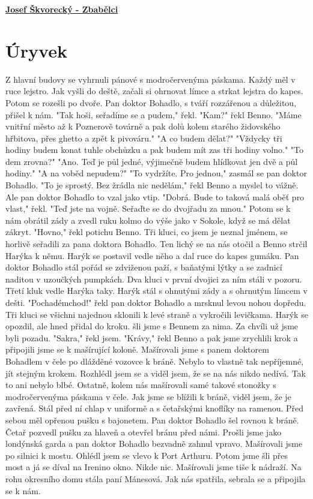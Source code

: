 \documentclass[11pt]{article}
\begin{document}
    \begin{center}
        \underline{\textbf{\Huge Josef Škvorecký - Zbabělci}}
    \end{center}
    \section*{Úryvek}
    Z hlavní budovy se vyhrnuli pánové s modročervenýma
páskama. Každý měl v ruce lejstro. Jak vyšli do deště, začali si
ohrnovat límce a strkat lejstra do kapes. Potom se rozešli po dvoře.
Pan doktor Bohadlo, s tváří rozzářenou a důležitou, přišel k nám.
"Tak hoši, seřadíme se a pudem," řekl.
"Kam?" řekl Benno.
"Máme vnitřní město až k Poznerově továrně a pak dolů
kolem starého židovského hřbitova, přes ghetto a zpět k pivováru."
"A co budem dělat?"
"Vždycky tři hodiny budem konat tuhle obchůzku a pak
budem mít zas tři hodiny volno."
"To dem zrovna?"
"Ano. Teď je půl jedné, výjimečně budem hlídkovat jen dvě a
půl hodiny."
"A na voběd nepudem?"
"To vydržíte. Pro jednou," zasmál se pan doktor Bohadlo.
"To je sprostý. Bez žrádla nic nedělám," řekl Benno a myslel to
vážně. Ale pan doktor Bohadlo to vzal jako vtip.
"Dobrá. Bude to taková malá oběť pro vlast," řekl. "Teď jste na
vojně. Seřaďte se do dvojřadu za mnou."
Potom se k nám obrátil zády a zvedl ruku kolmo do výše jako
v Sokole, když se má dělat zákryt.
"Hovno," řekl potichu Benno.
Tři kluci, co jsem je neznal jménem, se horlivě seřadili za pana
doktora Bohadlo. Ten lichý se na nás otočil a Benno strčil Harýka k
němu. Harýk se postavil vedle něho a dal ruce do kapes gumáku.
Pan doktor Bohadlo stál pořád se zdviženou paží, s baňatými lýtky
a se zadnicí naditou v uzoučkých pumpkách. Dva kluci v první
dvojici za ním stáli v pozoru. Třetí kluk vedle Harýka taky. Harýk
stál s ohnutými zády a s ohrnutým límcem v dešti.
"Pochadémchod!" řekl pan doktor Bohadlo a mrsknul levou
nohou dopředu. Tři kluci se všichni najednou sklonili k levé straně
a vykročili levičkama. Harýk se opozdil, ale hned přidal do kroku.
šli jsme s Bennem za nima. Za chvíli už jsme byli pozadu.
"Sakra," řekl jsem.
"Krávy," řekl Benno a pak jsme zrychlili krok a připojili jsme se
k mašírující koloně. Mašírovali jsme s panem doktorem Bohadlem v
čele po dlážděné vozovce k bráně. Nebylo to vlastně tak
nepříjemné, jít stejným krokem. Rozhlédl jsem se a viděl jsem, že se
na nás nikdo nedívá. Tak to ani nebylo blbé. Ostatně, kolem nás
mašírovali samé takové stonožky s modročervenýma páskama v
čele. Jak jsme se blížili k bráně, viděl jsem, že je zavřená. Stál před ní
chlap v uniformě a s četařskými knoflíky na ramenou. Před sebou
měl opřenou pušku s bajonetem. Pan doktor Bohadlo šel rovnou k
bráně. Četař pozvedl pušku za hlaveň a otevřel bránu před námi.
Prošli jsme jako londýnská garda a pan doktor Bohadlo bezvadně
zahnul vpravo. Mašírovali jsme po silnici k mostu. Ohlédl jsem se
vlevo k Port Arthuru. Potom jsme šli přes most a já se díval na
Irenino okno. Nikde nic. Mašírovali jsme tiše k nádraží. Na rohu
okresního domu stála paní Mánesová. Jak nás spatřila, sebrala se a
připojila se k nám.
\end{document}

